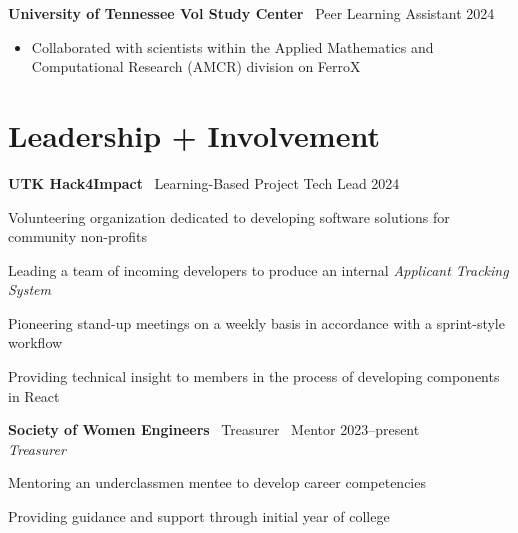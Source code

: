 \documentclass[11pt,a4paper]{article}
\begin{document}
\noindent
\textbf{University of Tennessee Vol Study Center} \textbar\ Peer Learning Assistant \hfill 2024 \vspace{-4pt}
\begin{itemize}[leftmargin=*, topsep=0pt, itemsep=0pt, partopsep=0pt, parsep=0pt]
  \small
  \item Collaborated with scientists within the Applied Mathematics and Computational Research (AMCR) division on FerroX
\end{itemize}
\vspace{-4pt}

\section*{Leadership + Involvement}

\noindent
\textbf{UTK Hack4Impact} \textbar\ Learning-Based Project Tech Lead \hfill 2024 \vspace{-4pt}
\begin{itemize}[leftmargin=*, topsep=0pt, itemsep=1pt, partopsep=0pt, parsep=0pt]
  {\small
  \item Volunteering organization dedicated to developing software solutions for community non-profits
  \item Leading a team of incoming developers to produce an internal \textit{Applicant Tracking System}
  \item Pioneering stand-up meetings on a weekly basis in accordance with a sprint-style workflow
  \item Providing technical insight to members in the process of developing components in React
  }
\end{itemize}
\vspace{-5pt}

\noindent
\textbf{Society of Women Engineers} \textbar\ Treasurer \textbar\ Mentor \hfill 2023--present \\ [-1pt]
\noindent\textit{Treasurer} \vspace{-6pt}
\begin{itemize}[leftmargin=*, topsep=0pt, itemsep=1pt, partopsep=0pt, parsep=0pt]
  {\small
  \item Mentoring an underclassmen mentee to develop career competencies
  \item Providing guidance and support through initial year of college
  }
\end{itemize}
\vspace{-5pt}
\end{document}
